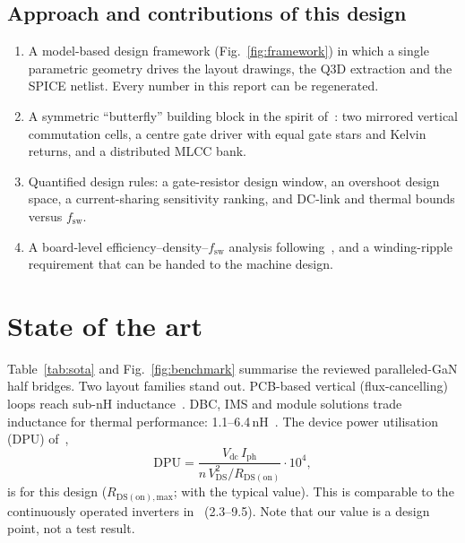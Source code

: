 \documentclass[10pt,a4paper]{article}
\begin{document}
\subsection{Approach and contributions of this design}
\begin{enumerate}\itemsep1pt
\item A model-based design framework (Fig.~\ref{fig:framework}) in which a single parametric geometry drives the layout drawings, the Q3D extraction and the SPICE netlist. Every number in this report can be regenerated.
\item A symmetric ``butterfly'' building block in the spirit of~\cite{wattenberg2023}: two mirrored vertical commutation cells, a centre gate driver with equal gate stars and Kelvin returns, and a distributed MLCC bank.
\item Quantified design rules: a gate-resistor design window, an overshoot design space, a current-sharing sensitivity ranking, and DC-link and thermal bounds versus $f_\mathrm{sw}$.
\item A board-level efficiency--density--$f_\mathrm{sw}$ analysis following~\cite{zou2025}, and a winding-ripple requirement that can be handed to the machine design.
\end{enumerate}

\section{State of the art}\label{sec:sota}
Table~\ref{tab:sota} and Fig.~\ref{fig:benchmark} summarise the reviewed paralleled-GaN half bridges.
Two layout families stand out.
PCB-based vertical (flux-cancelling) loops reach sub-nH inductance~\cite{lu2017,cooke2026}.
DBC, IMS and module solutions trade inductance for thermal performance: 1.1--6.4\,nH~\cite{tran2025,zou2025,rahman2025,novo2024}.
The device power utilisation (DPU) of~\cite{cooke2026},
\begin{equation}
\mathrm{DPU}=\frac{V_\mathrm{dc}\,I_\mathrm{ph}}{n\,V_\mathrm{DS}^2/R_\mathrm{DS(on)}}\cdot10^4,
\end{equation}
is \DpuMax{} for this design ($R_\mathrm{DS(on),max}$; \DpuTyp{} with the typical value).
This is comparable to the continuously operated inverters in~\cite{cooke2026} (2.3--9.5).
Note that our value is a design point, not a test result.
\end{document}
